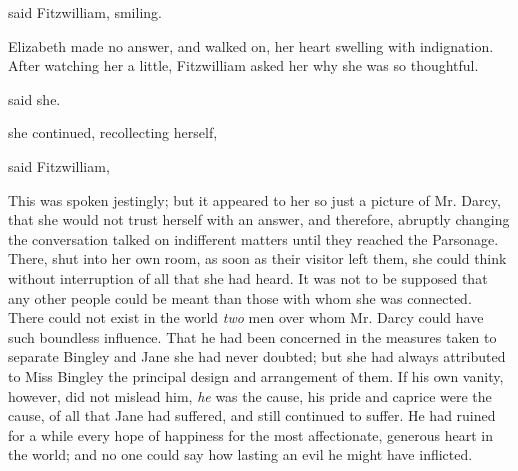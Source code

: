 


 said Fitzwilliam, smiling. 

Elizabeth made no answer, and walked on, her heart swelling with indignation. After watching her a little, Fitzwilliam asked her why she was so thoughtful.

 said she. 


 she continued, recollecting herself, 

 said Fitzwilliam, 

This was spoken jestingly; but it appeared to her so just a picture of Mr. Darcy, that she would not trust herself with an answer, and therefore, abruptly changing the conversation talked on indifferent matters until they reached the Parsonage. There, shut into her own room, as soon as their visitor left them, she could think without interruption of all that she had heard. It was not to be supposed that any other people could be meant than those with whom she was connected. There could not exist in the world {\em two} men over whom Mr. Darcy could have such boundless influence. That he had been concerned in the measures taken to separate Bingley and Jane she had never doubted; but she had always attributed to Miss Bingley the principal design and arrangement of them. If his own vanity, however, did not mislead him, {\em he} was the cause, his pride and caprice were the cause, of all that Jane had suffered, and still continued to suffer. He had ruined for a while every hope of happiness for the most affectionate, generous heart in the world; and no one could say how lasting an evil he might have inflicted.

